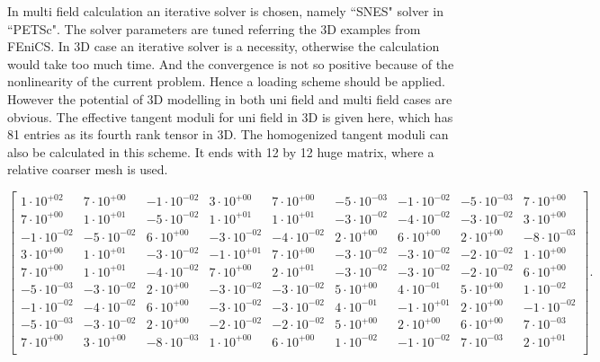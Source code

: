 \documentclass[10pt,a4paper]{scrreprt}
\begin{document}
In multi field calculation an iterative solver is chosen, namely ``SNES" solver in ``PETSc". The solver parameters are tuned referring the 3D examples from FEniCS. In 3D case an iterative solver is a necessity, otherwise the calculation would take too much time. And the convergence is not so positive because of the nonlinearity of the current problem. Hence a loading scheme should be applied. However the potential of 3D modelling in both uni field and multi field cases are obvious. The effective tangent moduli for uni field in 3D is given here, which has 81 entries as its fourth rank tensor in 3D. The homogenized tangent moduli can also be calculated in this scheme. It ends with 12 by 12 huge matrix, where a relative coarser mesh is used.
\begin{center}
\[
\begin{bmatrix}
1 \cdot 10^{+02} & 7 \cdot 10^{+00} & -1 \cdot 10^{-02} & 3 \cdot 10^{+00} & 7 \cdot 10^{+00} & -5 \cdot 10^{-03} & -1 \cdot 10^{-02} & -5 \cdot 10^{-03} & 7 \cdot 10^{+00}\\ 
7 \cdot 10^{+00} & 1 \cdot 10^{+01} & -5 \cdot 10^{-02} & 1 \cdot 10^{+01} & 1 \cdot 10^{+01} & -3 \cdot 10^{-02} & -4 \cdot 10^{-02} & -3 \cdot 10^{-02} & 3 \cdot 10^{+00}\\ 
-1 \cdot 10^{-02} & -5 \cdot 10^{-02} & 6 \cdot 10^{+00} & -3 \cdot 10^{-02} & -4 \cdot 10^{-02} & 2 \cdot 10^{+00} & 6 \cdot 10^{+00} & 2 \cdot 10^{+00} & -8 \cdot 10^{-03}\\ 
3 \cdot 10^{+00} & 1 \cdot 10^{+01} & -3 \cdot 10^{-02} & -1 \cdot 10^{+01} & 7 \cdot 10^{+00} & -3 \cdot 10^{-02} & -3 \cdot 10^{-02} & -2 \cdot 10^{-02} & 1 \cdot 10^{+00}\\ 
7 \cdot 10^{+00} & 1 \cdot 10^{+01} & -4 \cdot 10^{-02} & 7 \cdot 10^{+00} & 2 \cdot 10^{+01} & -3 \cdot 10^{-02} & -3 \cdot 10^{-02} & -2 \cdot 10^{-02} & 6 \cdot 10^{+00}\\ 
-5 \cdot 10^{-03} & -3 \cdot 10^{-02} & 2 \cdot 10^{+00} & -3 \cdot 10^{-02} & -3 \cdot 10^{-02} & 5 \cdot 10^{+00} & 4 \cdot 10^{-01} & 5 \cdot 10^{+00} & 1 \cdot 10^{-02}\\ 
-1 \cdot 10^{-02} & -4 \cdot 10^{-02} & 6 \cdot 10^{+00} & -3 \cdot 10^{-02} & -3 \cdot 10^{-02} & 4 \cdot 10^{-01} & -1 \cdot 10^{+01} & 2 \cdot 10^{+00} & -1 \cdot 10^{-02}\\ 
-5 \cdot 10^{-03} & -3 \cdot 10^{-02} & 2 \cdot 10^{+00} & -2 \cdot 10^{-02} & -2 \cdot 10^{-02} & 5 \cdot 10^{+00} & 2 \cdot 10^{+00} & 6 \cdot 10^{+00} & 7 \cdot 10^{-03}\\ 
7 \cdot 10^{+00} & 3 \cdot 10^{+00} & -8 \cdot 10^{-03} & 1 \cdot 10^{+00} & 6 \cdot 10^{+00} & 1 \cdot 10^{-02} & -1 \cdot 10^{-02} & 7 \cdot 10^{-03} & 2 \cdot 10^{+01}\\ 
\end{bmatrix}.
\]

\end{center}
\end{document}
